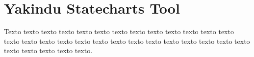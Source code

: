 \chapter{Yakindu Statecharts Tool}
\label{ape-yakindu}

Texto texto texto texto texto texto texto texto texto texto texto texto texto
texto texto texto texto texto texto texto texto texto texto texto texto texto
texto texto texto texto texto texto.

